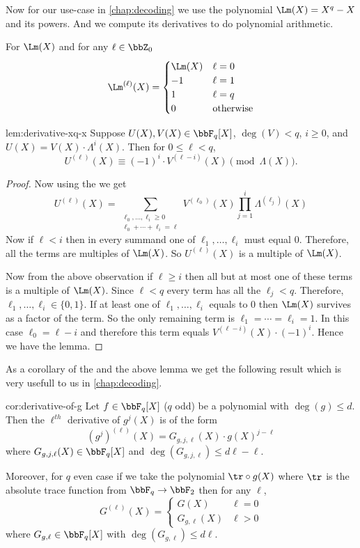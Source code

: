 Now for our use-case in \autoref{chap:decoding} we use the polynomial $\Lm(X)=X^q-X$ and its powers. And we compute its derivatives to do polynomial arithmetic. 
\begin{observation}
  For $\Lm(X)$ and for any $\ell\in\bbZ_0$ $$\Lm^{(\ell)}(X)=\begin{cases}
    \Lm(X) & \ell=0\\ -1 & \ell=1 \\ 1 & \ell =q \\ 0 & \text{otherwise}
  \end{cases}$$
\end{observation}
\begin{lemma}{}{lem:derivative-xq-x}
  Suppose $U(X), V(X) \in \bbF_q[X]$, $\deg(V) < q$, $i \geq 0$, and $U(X) = V(X)\cdot \Lambda^i(X)$. Then for $0 \leq \ell < q$,
  \[
    U^{(\ell)}(X) \equiv (-1)^i \cdot V^{(\ell-i)}(X)
    \pmod{\Lambda(X)}.
  \]
\end{lemma}
\begin{proof}
  Now using the  we get $$U^{(\ell)}(X)=\sum_{\substack{\ell_0,\dots, \ell_i\geq 0\\ \ell_0+\cdots +\ell_i=\ell}}V^{(\ell_0)}(X)\prod_{j=1}^i \Lambda^{(\ell_j)}(X)$$Now if $\ell<i$ then in every summand one of $\ell_1,\dots, \ell_i$ must equal $0$. Therefore, all the terms are multiples of $\Lm(X)$. So $U^{(\ell)}(X)$ is a multiple of $\Lm(X)$. 

  Now from the above observation if $\ell\geq i$ then all but at most one of these terms is a multiple of $\Lm(X)$. Since $\ell<q$ every term has all the $\ell_j<q$. Therefore, $\ell_1,\dots, \ell_i\in\{0,1\}$. If at least one of $\ell_1,\dots,\ell_i$ equals to $0$ then $\Lm(X)$ survives as a factor of the term. So the only remaining term is $\ell_1=\cdots =\ell_i=1$. In this case $\ell_0=\ell-i$ and therefore this term equals $V^{(\ell-i)}(X)\cdot (-1)^i$. Hence we have the lemma. 
\end{proof}
As a corollary of the  and the above lemma we get the following result which is very usefull to us in \autoref{chap:decoding}. 
\begin{corolary}{}{cor:derivative-of-g}
  Let $f\in\bbF_q[X]$ ($q$ odd) be a polynomial with $\deg(g)\leq d$. Then the $\ell^{th}$ derivative of $g^j(X)$ is of the form $$(g^j)^{(\ell)}(X)=G_{g,j,\ell}(X)\cdot g(X)^{j-\ell}$$where $G_{g,j,\ell}(X)\in\bbF_q[X]$ and $\deg(G_{g,j,\ell})\leq d\ell-\ell$. 

  Moreover, for $q$ even case if we take the polynomial $\tr\circ g(X)$ where $\tr$ is the absolute trace function from $\bbF_q\to\bbF_2$ then for any $\ell$, $$G^{(\ell)}(X)=\begin{cases}
    G(X) & \ell=0\\ G_{g,\ell}(X) & \ell>0
  \end{cases}$$where $G_{g,\ell}\in\bbF_q[X]$ with $\deg(G_{g,\ell})\leq d\ell$. 
\end{corolary}
